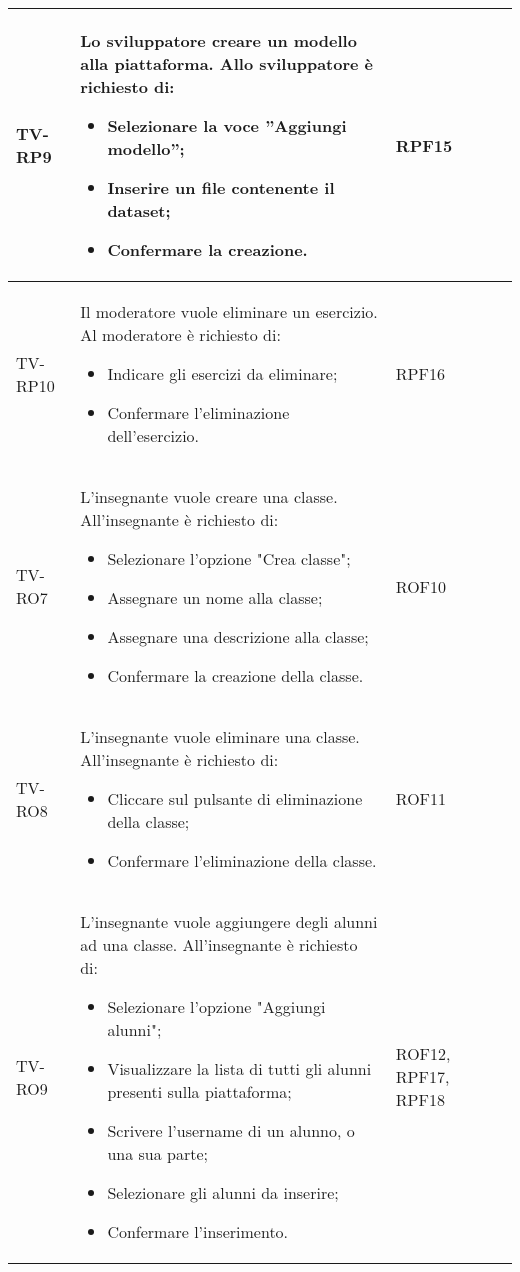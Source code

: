 \begin{longtable}{|>{\centering\arraybackslash}m{1.6cm}|>{\centering\arraybackslash}m{6.41cm}|>{\centering\arraybackslash}m{3.1cm} | >{\centering\arraybackslash}m{2.6cm}|}
		TV-RP9 & Lo sviluppatore creare un modello alla piattaforma. Allo sviluppatore è richiesto di:
\begin{itemize}
 \item Selezionare la voce ”Aggiungi modello”;
 \item Inserire un file contenente il dataset;
 \item Confermare la creazione.
\end{itemize}  & RPF15 \\ \hline

		  \rowcolor{LightGray}
TV-RP10 & Il moderatore vuole eliminare un esercizio. Al moderatore è richiesto di:
\begin{itemize}
 \item Indicare gli esercizi da eliminare;
 \item Confermare l'eliminazione dell'esercizio.
\end{itemize}  & RPF16 \\ \hline

TV-RO7 & L'insegnante vuole creare una classe. All'insegnante è richiesto di:
\begin{itemize}
 \item Selezionare l'opzione "Crea classe";
 \item Assegnare un nome alla classe;
 \item Assegnare una descrizione alla classe;
 \item Confermare la creazione della classe.
\end{itemize}  & ROF10 \\ \hline

		  \rowcolor{LightGray}
TV-RO8 & L'insegnante vuole eliminare una classe. All'insegnante è richiesto di:
\begin{itemize}
 \item Cliccare sul pulsante di eliminazione della classe;
 \item Confermare l'eliminazione della classe.
\end{itemize}  & ROF11 \\ \hline

TV-RO9 & L'insegnante vuole aggiungere degli alunni ad una classe. All'insegnante è richiesto di:
\begin{itemize}
 \item Selezionare l'opzione "Aggiungi alunni";
 \item Visualizzare la lista di tutti gli alunni presenti sulla piattaforma;
 \item Scrivere l'username di un alunno, o una sua parte;
 \item Selezionare gli alunni da inserire;
 \item Confermare l'inserimento.
\end{itemize}  & ROF12, RPF17, RPF18 \\ \hline


\end{longtable}
